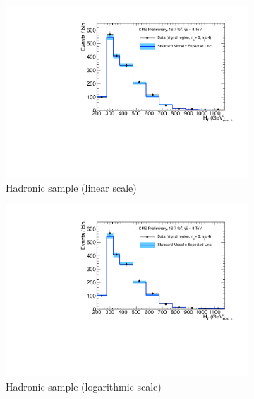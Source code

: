 \clearpage
\begin{figure}[h!]
  \centering
  \begin{subfigure}[b]{0.48\textwidth}
    \includegraphics[width=\textwidth,page=1]
    {Figs/results/v0/blueBand/bestFit_2012dev_RQcdZero_fZinvAll_0b_ge4j-12hp_smOnly}
    \caption{Hadronic sample (linear scale)}
  \end{subfigure}
  \begin{subfigure}[b]{0.48\textwidth}
    \includegraphics[width=\textwidth,page=2]
    {Figs/results/v0/blueBand/bestFit_2012dev_RQcdZero_fZinvAll_0b_ge4j-12hp_smOnly}
    \caption{Hadronic sample (logarithmic scale)}
  \end{subfigure}
  \begin{subfigure}[b]{0.48\textwidth}

\end{subfigure}
\end{figure}
